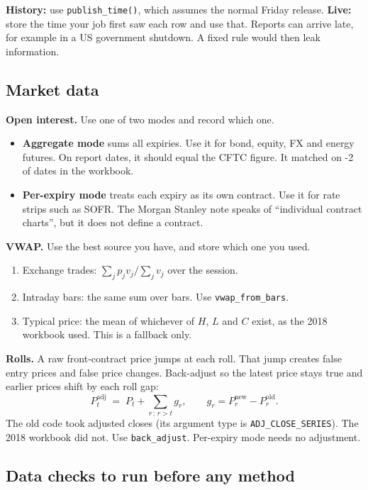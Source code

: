 \documentclass[11pt,a4paper]{article}
\newcommand{\code}[1]{\nolinkurl{#1}}
\begin{document}
\begin{decision}
\textbf{History:} use \code{publish_time()}, which assumes the normal Friday release. \textbf{Live:} store the time your job first saw each row and use that. Reports can arrive late, for example in a US government shutdown. A fixed rule would then leak information.
\end{decision}

\subsection{Market data}

\textbf{Open interest.} Use one of two modes and record which one.
\begin{itemize}
\item \textbf{Aggregate mode} sums all expiries. Use it for bond, equity, FX and energy futures. On report dates, it should equal the CFTC figure. It matched on \the{}-2\relax{} of \ApiOiDates{} dates in the workbook.
\item \textbf{Per-expiry mode} treats each expiry as its own contract. Use it for rate strips such as SOFR. The Morgan Stanley note speaks of ``individual contract charts'', but it does not define a contract.
\end{itemize}

\textbf{VWAP.} Use the best source you have, and store which one you used.
\begin{enumerate}
\item Exchange trades: $\sum_j p_j v_j / \sum_j v_j$ over the session.
\item Intraday bars: the same sum over bars. Use \code{vwap_from_bars}.
\item Typical price: the mean of whichever of $H$, $L$ and $C$ exist, as the 2018 workbook used. This is a fallback only.
\end{enumerate}

\textbf{Rolls.} A raw front-contract price jumps at each roll. That jump creates false entry prices and false price changes. Back-adjust so the latest price stays true and earlier prices shift by each roll gap:
\[
P^{\text{adj}}_t \;=\; P_t + \sum_{r \,:\, r > t} g_r, \qquad g_r = P^{\text{new}}_r - P^{\text{old}}_r .
\]
The old code took adjusted closes (its argument type is \code{ADJ_CLOSE_SERIES}). The 2018 workbook did not. Use \code{back_adjust}. Per-expiry mode needs no adjustment.

\subsection{Data checks to run before any method}
\end{document}
